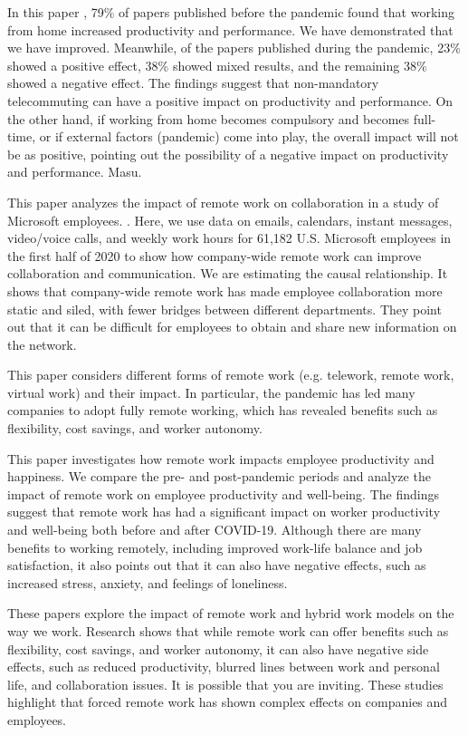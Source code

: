\documentclass[12pt]{article}
\begin{document}
In this paper \cite{10.1371/journal.pone.0274728}, 79\% of papers published
before the pandemic found
that working from home
increased productivity and performance. We have demonstrated that we have
improved. Meanwhile, of the papers published during the pandemic, 23\% showed a
positive effect, 38\% showed mixed results, and the remaining 38\% showed a
negative effect. The findings suggest that non-mandatory telecommuting can have
a positive impact on productivity and performance. On the other hand, if
working from home becomes compulsory and becomes full-time, or if external
factors (pandemic) come into play, the overall impact will not be as positive,
pointing out the possibility of a negative impact on productivity and
performance. Masu.

This paper \cite{Yang2022} analyzes the
impact of remote work on collaboration in a study of Microsoft employees. .
Here, we use data on emails, calendars, instant messages, video/voice calls,
and weekly work hours for 61,182 U.S. Microsoft employees in the first half of
2020 to show how company-wide remote work can improve collaboration and
communication. We are estimating the causal relationship. It shows that
company-wide remote work has made employee collaboration more static and siled,
with fewer bridges between different departments. They point out that it can be
difficult for employees to obtain and share new information on the network.

This paper \cite{inproceedings} considers different forms of remote work (e.g.
telework, remote work, virtual
work) and their impact. In particular, the pandemic has led many companies to
adopt fully remote working, which has revealed benefits such as flexibility,
cost savings, and worker autonomy.

This paper \cite{SJ2023} investigates
how remote work impacts employee productivity and happiness. We compare the
pre- and post-pandemic periods and analyze the impact of remote work on
employee productivity and well-being. The findings suggest that remote work has
had a significant impact on worker productivity and well-being both before and
after COVID-19. Although there are many benefits to working remotely, including
improved work-life balance and job satisfaction, it also points out that it can
also have negative effects, such as increased stress, anxiety, and feelings of
loneliness.

These papers explore the impact of remote work and hybrid work models on the
way we work. Research shows that while remote work can offer benefits such as
flexibility, cost savings, and worker autonomy, it can also have negative side
effects, such as reduced productivity, blurred lines between work and personal
life, and collaboration issues. It is possible that you are inviting. These
studies highlight that forced remote work has shown complex effects on
companies and employees.
\end{document}
